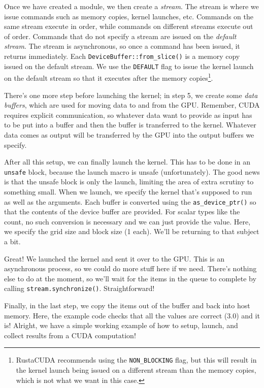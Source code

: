 \documentclass[a4paper]{report}
\begin{document}
Once we have created a module, we then create a \textit{stream}. The stream is where we issue commands such as memory copies, kernel launches, etc. Commands on the same stream execute in order, while commands on different streams execute out of order. Commands that do not specify a stream are issued on the \textit{default stream}. The stream is asynchronous, so once a command has been issued, it returns immediately. Each \texttt{DeviceBuffer::from\_slice()} is a memory copy issued on the default stream. We use the \texttt{DEFAULT} flag to issue the kernel launch on the default stream so that it executes after the memory copies\footnote{RustaCUDA recommends using the \texttt{NON\_BLOCKING} flag, but this will result in the kernel launch being issued on a different stream than the memory copies, which is not what we want in this case.}.

There's one more step before launching the kernel; in step 5, we
create some \emph{data buffers}, which are used for moving data to and from the GPU. Remember, CUDA requires explicit communication, so whatever data want to provide as input has to be put into a buffer and then the buffer is transferred to the kernel. Whatever data comes as output will be transferred by the GPU into the output buffers we specify.

After all this setup, we can finally launch the kernel. This has to be done in an \texttt{unsafe} block, because the launch macro is unsafe (unfortunately). The good news is that the unsafe block is only the launch, limiting the area of extra scrutiny to something small. When we launch, we specify the kernel that's supposed to run as well as the arguments. Each buffer is converted using the \texttt{as\_device\_ptr()} so that the contents of the device buffer are provided. For scalar types like the count, no such conversion is necessary and we can just provide the value. Here, we specify the grid size and block size (1 each). We'll be returning to that subject a bit.

Great! We launched the kernel and sent it over to the GPU. This is an asynchronous process, so we could do more stuff here if we need. There's nothing else to do at the moment, so we'll wait for the items in the queue to complete by calling \texttt{stream.synchronize()}. Straightforward!

Finally, in the last step, we copy the items out of the buffer and back into host memory. Here, the example code checks that all the values are correct (3.0) and it is! Alright, we have a simple working example of how to setup, launch, and collect results from a CUDA computation!
\end{document}
